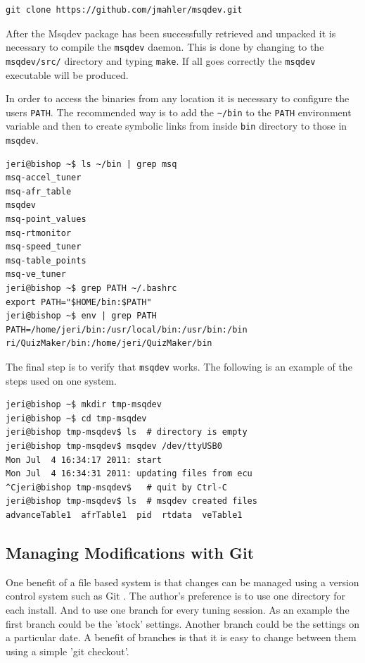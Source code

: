 \documentclass{article}
\begin{document}
\begin{verbatim}
git clone https://github.com/jmahler/msqdev.git
\end{verbatim}

After the Msqdev package has been successfully retrieved and unpacked
it is necessary to compile the \verb+msqdev+ daemon.
This is done by changing to the \verb+msqdev/src/+ directory and typing
\verb+make+.
If all goes correctly the \verb+msqdev+ executable will be produced.

In order to access the binaries from any location it is necessary to
configure the users \verb+PATH+.
The recommended way is to add the \verb+~/bin+ to the \verb+PATH+ environment
variable and then to create symbolic links from inside \verb+bin+ directory
to those in \verb+msqdev+.

\begin{verbatim}
jeri@bishop ~$ ls ~/bin | grep msq
msq-accel_tuner
msq-afr_table
msqdev
msq-point_values
msq-rtmonitor
msq-speed_tuner
msq-table_points
msq-ve_tuner
jeri@bishop ~$ grep PATH ~/.bashrc
export PATH="$HOME/bin:$PATH"
jeri@bishop ~$ env | grep PATH
PATH=/home/jeri/bin:/usr/local/bin:/usr/bin:/bin
ri/QuizMaker/bin:/home/jeri/QuizMaker/bin
\end{verbatim}

The final step is to verify that \verb+msqdev+ works.
The following is an example of the steps used on one system.

\begin{verbatim}
jeri@bishop ~$ mkdir tmp-msqdev
jeri@bishop ~$ cd tmp-msqdev
jeri@bishop tmp-msqdev$ ls  # directory is empty
jeri@bishop tmp-msqdev$ msqdev /dev/ttyUSB0 
Mon Jul  4 16:34:17 2011: start
Mon Jul  4 16:34:31 2011: updating files from ecu
^Cjeri@bishop tmp-msqdev$   # quit by Ctrl-C
jeri@bishop tmp-msqdev$ ls  # msqdev created files
advanceTable1  afrTable1  pid  rtdata  veTable1
\end{verbatim}

\subsection{Managing Modifications with Git}

One benefit of a file based system is that changes can be
managed using a version control system such as Git \cite{GIT}.
The author's preference is to use one directory for each install.
And to use one branch for every tuning session.
As an example the first branch could be the 'stock' settings.
Another branch could be the settings on a particular date.
A benefit of branches is that it is easy to change between them
using a simple 'git checkout'.
\end{document}
